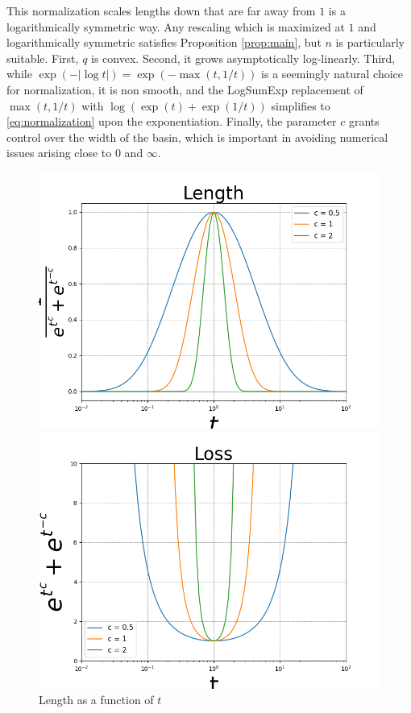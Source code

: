 \documentclass[a4paper,11pt]{article}
\begin{document}
This normalization scales lengths down that are far away from $1$ is a logarithmically symmetric way.
Any rescaling which is maximized at $1$ and logarithmically symmetric satisfies Proposition \ref{prop:main}, but $n$ is particularly suitable.
First, $q$ is convex.
Second, it grows asymptotically log-linearly.
Third, while $\exp(-|\log t|) = \exp(-\max (t, 1/t))$ is a seemingly natural choice for normalization, it is non smooth, and the LogSumExp replacement of $\max (t, 1/t)$ with $ \log (\exp (t ) + \exp(1/t))$ simplifies to \ref{eq:normalization} upon the exponentiation.
Finally, the parameter $c$ grants control over the width of the basin, which is important in avoiding numerical issues arising close to $0$ and $\infty$.

\begin{figure}[htbp]
    \centering
    \begin{minipage}{0.49\textwidth}
        \centering
        \includegraphics[width=\textwidth]{../figures/Figure_1a.png}
        \caption{Length as a function of $t$}
        \label{fig:length}
    \end{minipage}
    \hfill
    \begin{minipage}{0.49\textwidth}
        \centering
        \includegraphics[width=\textwidth]{../figures/Figure_1b.png}

\end{minipage}
\end{figure}
\end{document}
